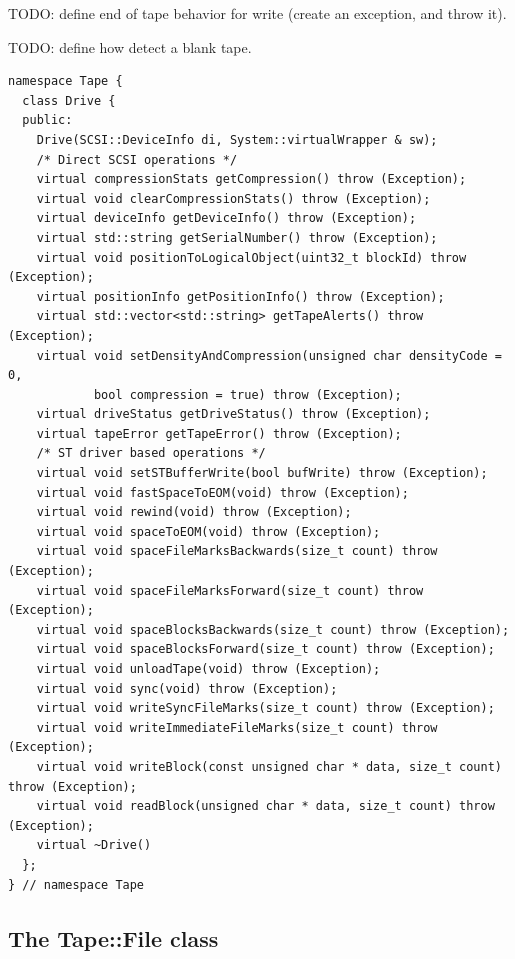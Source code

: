 TODO: define end of tape behavior for write (create an exception, and throw it).

TODO: define how detect a blank tape.

\begin{table}
\begin{lstlisting}[caption=Tape::Drive interface,label=drive_if]
namespace Tape {
  class Drive {
  public:
    Drive(SCSI::DeviceInfo di, System::virtualWrapper & sw);
    /* Direct SCSI operations */
    virtual compressionStats getCompression() throw (Exception);
    virtual void clearCompressionStats() throw (Exception);
    virtual deviceInfo getDeviceInfo() throw (Exception);
    virtual std::string getSerialNumber() throw (Exception);
    virtual void positionToLogicalObject(uint32_t blockId) throw (Exception);
    virtual positionInfo getPositionInfo() throw (Exception);
    virtual std::vector<std::string> getTapeAlerts() throw (Exception);
    virtual void setDensityAndCompression(unsigned char densityCode = 0,
            bool compression = true) throw (Exception);
    virtual driveStatus getDriveStatus() throw (Exception);
    virtual tapeError getTapeError() throw (Exception);
    /* ST driver based operations */
    virtual void setSTBufferWrite(bool bufWrite) throw (Exception);
    virtual void fastSpaceToEOM(void) throw (Exception);
    virtual void rewind(void) throw (Exception);
    virtual void spaceToEOM(void) throw (Exception);
    virtual void spaceFileMarksBackwards(size_t count) throw (Exception);
    virtual void spaceFileMarksForward(size_t count) throw (Exception);
    virtual void spaceBlocksBackwards(size_t count) throw (Exception);
    virtual void spaceBlocksForward(size_t count) throw (Exception);
    virtual void unloadTape(void) throw (Exception);
    virtual void sync(void) throw (Exception);
    virtual void writeSyncFileMarks(size_t count) throw (Exception);
    virtual void writeImmediateFileMarks(size_t count) throw (Exception);
    virtual void writeBlock(const unsigned char * data, size_t count) throw (Exception);
    virtual void readBlock(unsigned char * data, size_t count) throw (Exception);
    virtual ~Drive()
  };
} // namespace Tape
\end{lstlisting}
\end{table}

\subsection{The Tape::File class}
